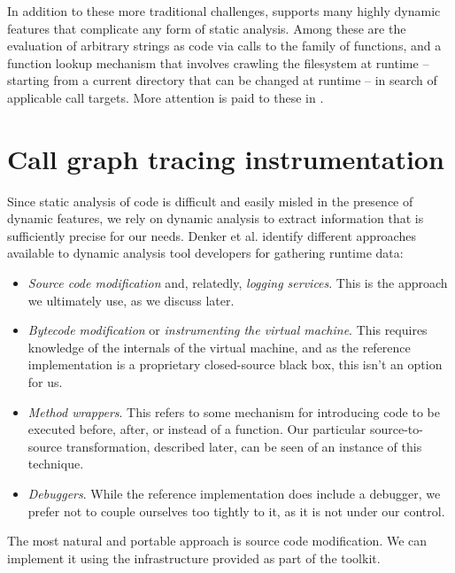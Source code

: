 In addition to these more traditional challenges, \matlab supports many highly
dynamic features that complicate any form of static analysis. Among these are
the evaluation of arbitrary strings as code via calls to the  family
of functions, and a function lookup mechanism that involves crawling the
filesystem at runtime -- starting from a current directory that can be changed
at runtime -- in search of applicable call targets. More attention is paid to
these in .

\section{Call graph tracing instrumentation}

Since static analysis of \matlab code is difficult and easily misled in the
presence of dynamic features, we rely on dynamic analysis to extract
information that is sufficiently precise for our needs. Denker et al.
\cite{AbstractionsForDynamicAnalysis} identify different approaches available
to dynamic analysis tool developers for gathering runtime data:

\begin{itemize}
\item \emph{Source code modification} and, relatedly, \emph{logging services}.
This is the approach we ultimately use, as we discuss later.
\item \emph{Bytecode modification} or \emph{instrumenting the virtual machine}.
This requires knowledge of the internals of the \matlab virtual machine, and as
the reference \matlab implementation is a proprietary closed-source black box,
this isn't an option for us.
\item \emph{Method wrappers}. This refers to some mechanism for introducing
code to be executed before, after, or instead of a function. Our particular
source-to-source transformation, described later, can be seen of an instance of
this technique.
\item \emph{Debuggers}. While the reference \matlab implementation does include
a debugger, we prefer not to couple ourselves too tightly to it, as it is not
under our control.
\end{itemize}

The most natural and portable approach is source code modification. We can
implement it using the infrastructure provided as part of the \mclab toolkit.


